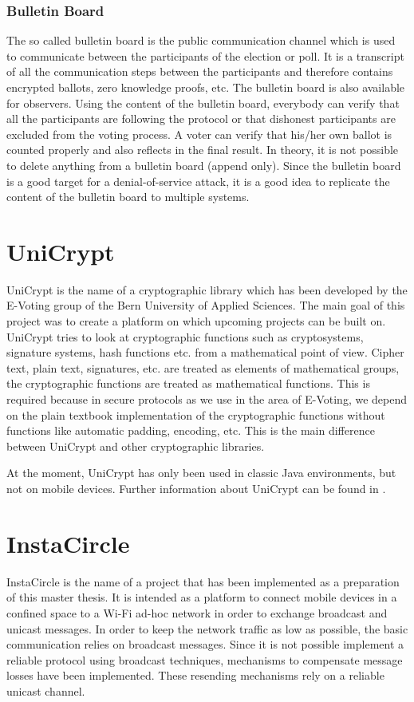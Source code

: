 \documentclass[numbers=noenddot, abstract=on]{scrreprt}
\begin{document}
\subsubsection{Bulletin Board}
\label{sec:bulletinboard}
The so called bulletin board is the
public communication channel which is used to communicate between the
participants of the election or poll. It is a transcript of all the
communication steps between the participants and therefore contains encrypted
ballots, zero knowledge proofs, etc. The bulletin board is also available for
observers. Using the content of the bulletin board, everybody can verify that
all the participants are following the protocol or that dishonest participants
are excluded from the voting process. A voter can verify that his/her own
ballot is counted properly and also reflects in the final result. In theory, it
is not possible to delete anything from a bulletin board (append only). Since
the bulletin board is a good target for a denial-of-service attack, it is a good
idea to replicate the content of the bulletin board to multiple systems.

\section{UniCrypt}
\label{sec:unicrypt}
UniCrypt is the name of a cryptographic library which has been developed by the
E-Voting group of the Bern University of Applied Sciences. The main goal of this
project was to create a platform on which upcoming projects can be built on.
UniCrypt tries to look at cryptographic functions such as cryptosystems,
signature systems, hash functions etc. from a mathematical point of view. Cipher
text, plain text, signatures, etc. are treated as elements of mathematical
groups, the cryptographic functions are treated as mathematical functions. This
is required because in secure protocols as we use in the area of E-Voting, we
depend on the plain textbook implementation of the cryptographic functions
without functions like automatic padding, encoding, etc. This is the main
difference between UniCrypt and other cryptographic libraries.

At the moment, UniCrypt has only been used in classic Java environments, but not
on mobile devices. Further information about UniCrypt can be found in
\cite{ritter12}.

\section{InstaCircle}
\label{sec:instacircle}
InstaCircle is the name of a project that has been implemented as a preparation
of this master thesis. It is intended as a platform to connect mobile devices
in a confined space to a Wi-Fi ad-hoc network in order to exchange broadcast
and unicast messages. In order to keep the network traffic as low as possible,
the basic communication relies on broadcast messages. Since it is not possible
implement a reliable protocol using broadcast techniques, mechanisms to
compensate message losses have been implemented. These resending mechanisms rely
on a reliable unicast channel.
\end{document}
